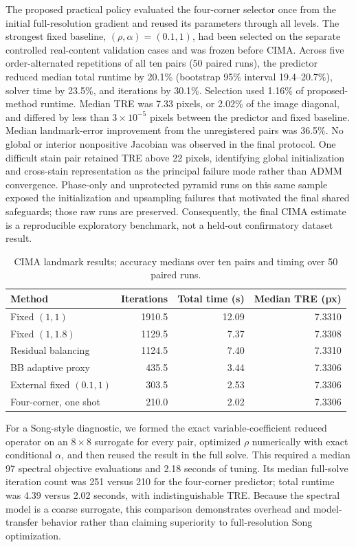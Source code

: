 \documentclass[pdflatex,iicol,sn-mathphys-num]{sn-jnl}
\theoremstyle{definition}\newtheorem{definition}[theorem]{Definition}\newtheorem{remark}[theorem]{Remark}
\begin{document}
The proposed practical policy evaluated the four-corner selector once from the
initial full-resolution gradient and reused its parameters through all levels.
The strongest fixed baseline, $(\rho,\alpha)=(0.1,1)$, had been selected on the
separate controlled real-content validation cases and was frozen before CIMA.
Across five order-alternated repetitions of all ten pairs (50 paired runs), the
predictor reduced median total runtime by 20.1\% (bootstrap 95\% interval
19.4--20.7\%), solver time by 23.5\%, and iterations by 30.1\%.  Selection used
1.16\% of proposed-method runtime.  Median TRE was 7.33 pixels, or 2.02\% of the
image diagonal, and differed by less than $3\times10^{-5}$ pixels between the
predictor and fixed baseline.  Median landmark-error improvement from the
unregistered pairs was 36.5\%.  No global or interior nonpositive Jacobian was
observed in the final protocol.  One difficult stain pair retained TRE above
22 pixels, identifying global initialization and cross-stain representation as
the principal failure mode rather than ADMM convergence.  Phase-only and
unprotected pyramid runs on this same sample exposed the initialization and
upsampling failures that motivated the final shared safeguards; those raw runs
are preserved.  Consequently, the final CIMA estimate is a reproducible
exploratory benchmark, not a held-out confirmatory dataset result.

\begin{table}[ht]
\centering
\caption{CIMA landmark results; accuracy medians over ten pairs and timing over 50 paired runs.}
\begin{tabular}{lrrr}
\toprule
Method & Iterations & Total time (s) & Median TRE (px)\\
\midrule
Fixed $(1,1)$ & 1910.5 & 12.09 & 7.3310\\
Fixed $(1,1.8)$ & 1129.5 & 7.37 & 7.3308\\
Residual balancing & 1124.5 & 7.40 & 7.3310\\
BB adaptive proxy & 435.5 & 3.44 & 7.3306\\
External fixed $(0.1,1)$ & 303.5 & 2.53 & 7.3306\\
Four-corner, one shot & 210.0 & 2.02 & 7.3306\\
\bottomrule
\end{tabular}
\end{table}

For a Song-style diagnostic, we formed the exact variable-coefficient reduced
operator on an $8\times8$ surrogate for every pair, optimized $\rho$
numerically with exact conditional $\alpha$, and then reused the result in the
full solve.  This required a median 97 spectral objective evaluations and
2.18 seconds of tuning.  Its median full-solve iteration count was 251 versus
210 for the four-corner predictor; total runtime was 4.39 versus 2.02 seconds,
with indistinguishable TRE.  Because the spectral model is a coarse surrogate,
this comparison demonstrates overhead and model-transfer behavior rather than
claiming superiority to full-resolution Song optimization.
\end{document}
